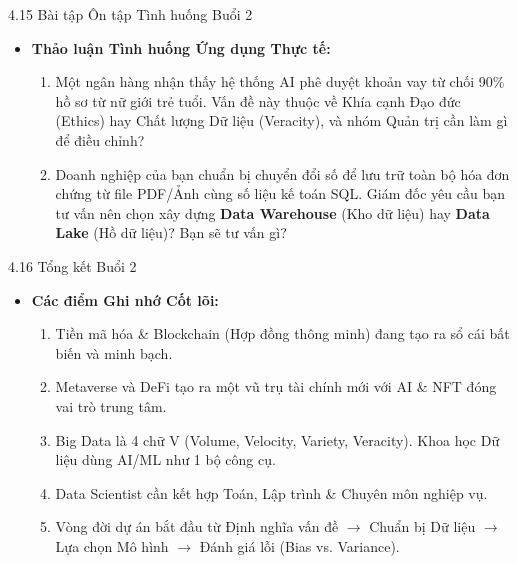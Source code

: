 \documentclass[aspectratio=169]{beamer}
\begin{document}
\begin{frame}{4.15 Bài tập Ôn tập Tình huống Buổi 2}
    \begin{itemize}
        \item \textbf{Thảo luận Tình huống Ứng dụng Thực tế:}
        \begin{enumerate}
            \item Một ngân hàng nhận thấy hệ thống AI phê duyệt khoản vay từ chối 90\% hồ sơ từ nữ giới trẻ tuổi. Vấn đề này thuộc về Khía cạnh Đạo đức (Ethics) hay Chất lượng Dữ liệu (Veracity), và nhóm Quản trị cần làm gì để điều chỉnh?
            \item Doanh nghiệp của bạn chuẩn bị chuyển đổi số để lưu trữ toàn bộ hóa đơn chứng từ file PDF/Ảnh cùng số liệu kế toán SQL. Giám đốc yêu cầu bạn tư vấn nên chọn xây dựng \textbf{Data Warehouse} (Kho dữ liệu) hay \textbf{Data Lake} (Hồ dữ liệu)? Bạn sẽ tư vấn gì?
        \end{enumerate}
    \end{itemize}
\end{frame}

\begin{frame}{4.16 Tổng kết Buổi 2}
    \begin{itemize}
        \item \textbf{Các điểm Ghi nhớ Cốt lõi:}
        \begin{enumerate}
            \item Tiền mã hóa \& Blockchain (Hợp đồng thông minh) đang tạo ra sổ cái bất biến và minh bạch.
            \item Metaverse và DeFi tạo ra một vũ trụ tài chính mới với AI \& NFT đóng vai trò trung tâm.
            \item Big Data là 4 chữ V (Volume, Velocity, Variety, Veracity). Khoa học Dữ liệu dùng AI/ML như 1 bộ công cụ.
            \item Data Scientist cần kết hợp Toán, Lập trình \& Chuyên môn nghiệp vụ.
            \item Vòng đời dự án bắt đầu từ Định nghĩa vấn đề $\rightarrow$ Chuẩn bị Dữ liệu $\rightarrow$ Lựa chọn Mô hình $\rightarrow$ Đánh giá lỗi (Bias vs. Variance).
        \end{enumerate}
    \end{itemize}
\end{frame}
\end{document}
